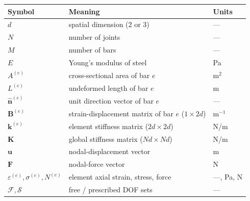 \begin{tabular}{@{}l l l@{}}
  \toprule
  Symbol & Meaning & Units \\
  \midrule
  $d$ & spatial dimension (2 or 3) & --- \\
  $N$ & number of joints & --- \\
  $M$ & number of bars & --- \\
  $E$ & Young's modulus of steel & Pa \\
  $A^{(e)}$ & cross-sectional area of bar $e$ & $\mathrm{m}^2$ \\
  $L^{(e)}$ & undeformed length of bar $e$ & m \\
  $\hat{\mathbf{n}}^{(e)}$ & unit direction vector of bar $e$ & --- \\
  $\mathbf{B}^{(e)}$ & strain-displacement matrix of bar $e$ ($1\!\times\!2d$) & $\mathrm{m}^{-1}$ \\
  $\mathbf{k}^{(e)}$ & element stiffness matrix ($2d\!\times\!2d$) & N/m \\
  $\mathbf{K}$ & global stiffness matrix ($Nd\!\times\!Nd$) & N/m \\
  $\mathbf{u}$ & nodal-displacement vector & m \\
  $\mathbf{F}$ & nodal-force vector & N \\
  $\varepsilon^{(e)},\sigma^{(e)},N^{(e)}$ & element axial strain, stress, force & ---, Pa, N \\
  $\mathcal{F},\mathcal{S}$ & free / prescribed DOF sets & --- \\
  \bottomrule
\end{tabular}
